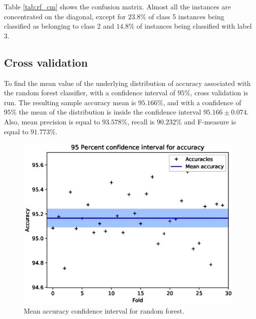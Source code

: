 \documentclass[a4paper, 10pt]{article}
\begin{document}
Table \ref{tab:rf_cm} shows the confusion matrix. Almost all the instances are concentrated on the diagonal, except for $23.8\%$ of class 5 instances being classified as belonging to class 2 and $14.8\%$ of instances being classified with label 3. 

\subsection{Cross validation}

To find the mean value of the underlying distribution of accuracy associated with the random forest classifier, with a confidence interval of $95\%$, cross validation is run. The resulting sample accuracy mean is $95.166\%$, and with a confidence of $95\%$ the mean of the distribution is inside the confidence interval $95.166 \pm 0.074$. Also, mean precision is equal to $93.578\%$, recall is $90.232\%$ and F-measure is equal to $91.773\%$.  

\begin{figure}[H]
 \centering
 \includegraphics[width=0.8\linewidth]{pictures/random_forest_accuracy_interval.eps}
 \caption{Mean accuracy confidence interval for random forest.}
 \label{fig:rf_accuracy}
\end{figure}
\end{document}
